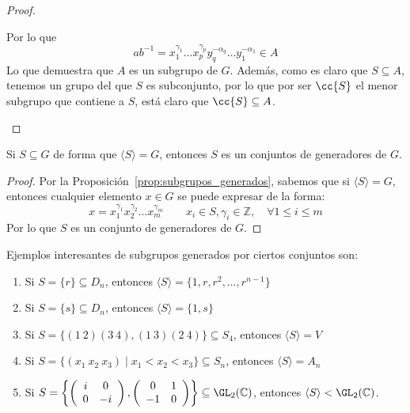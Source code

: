\begin{prop}
\begin{proof}
\begin{itemize}
\begin{description}
\begin{equation*}
{}                        \end{equation*}
                        Por lo que
                        \begin{equation*}
                            ab^{-1} = x_1^{\gamma_1} \ldots x_p^{\gamma_p} y_q^{-\alpha_q} \ldots y_1^{-\alpha_1} \in A
                        \end{equation*}
                        Lo que demuestra que $A$ es un subgrupo de $G$. Además, como es claro que $S\subseteq A$, tenemos un grupo del que $S$ es subconjunto, por lo que por ser $\cc{S}$ el menor subgrupo que contiene a $S$, está claro que $\cc{S}\subseteq A$.
                \end{description}
        \end{itemize}
    \end{proof}
\end{prop}

\begin{coro}
    Si $S\subseteq G$ de forma que $\langle S \rangle =G$, entonces $S$ es un conjuntos de generadores de $G$.
    \begin{proof}
        Por la Proposición~\ref{prop:subgrupos_generados}, sabemos que si $\langle S \rangle = G$, entonces cualquier elemento $x\in G$ se puede expresar de la forma:
        \begin{equation*}
            x = x_1^{\gamma_1}x_2^{\gamma_2}\ldots x_m^{\gamma_m} \qquad x_i \in S, \gamma_i \in \mathbb{Z}, \quad \forall 1\leq i \leq m
        \end{equation*}
        Por lo que $S$ es un conjunto de generadores de $G$.
    \end{proof}
\end{coro}

\begin{ejemplo}
    Ejemplos interesantes de subgrupos generados por ciertos conjuntos son:
    \begin{enumerate}
        \item Si $S= \{r\}\subseteq D_n$, entonces $\langle S \rangle = \{1,r,r^2, \ldots, r^{n-1}\}$
        \item Si $S = \{s\}\subseteq D_n$, entonces $\langle S \rangle = \{1, s\}$
        \item Si $S = \{(1\ 2)(3\ 4), (1\ 3)(2\ 4)\}\subseteq S_4$, entonces $\langle S \rangle = V$
        \item Si $S=\{(x_1\ x_2\ x_3) \mid x_1<x_2<x_3\}\subseteq S_n$, entonces $\langle S \rangle = A_n$
        \item Si $S = \left\{\left(\begin{array}{cc}
            i & 0 \\
            0 & -i 
        \end{array}\right),  \left(\begin{array}{cc}
            0 & 1 \\
            -1 & 0 
        \end{array}\right)\right\}\subseteq \GL_2(\mathbb{C})$, entonces $\langle S \rangle < \GL_2(\mathbb{C})$.
    \end{enumerate}
\end{ejemplo}

